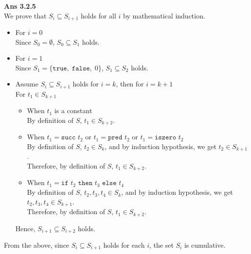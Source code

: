 \documentclass[a4paper,11pt,fleqn,dvipdfmx]{article}
\newcommand{\ansen}[1]{\noindent\textbf{Ans #1}\\[2mm]}
\begin{document}
    \pagebreak

    \ansen{3.2.5}
        We prove that $S_i \subseteq S_{i+1}$ holds for all $i$ by mathematical induction.
        \begin{itemize}
            \item For $i=0$ \\[2mm]
                Since $S_0 = \emptyset$, $S_0 \subseteq S_1$ holds.
            \item For $i=1$ \\[2mm]
                Since $S_1 = \{\texttt{true}, \; \texttt{false}, \; 0\}$, $S_1 \subseteq S_2$ holds.
            \item Assume $S_i \subseteq S_{i+1}$ holds for $i=k$, then for $i=k+1$ \\[2mm]
                For $t_1 \in S_{k+1}$
                \begin{itemize}
                    \item When $t_1$ is a constant \\[2mm]
                        By definition of $S$, $t_1 \in S_{k+2}$.
                    \item When $t_1 = \texttt{succ } t_2$ or $t_1 = \texttt{pred } t_2$ or $t_1 = \texttt{iszero } t_2$ \\[2mm]
                        By definition of $S$, $t_2 \in S_k$, and by induction hypothesis, we get $t_2 \in S_{k+1}$. \\
                        Therefore, by definition of $S$, $t_1 \in S_{k+2}$.
                    \item When $t_1 = \texttt{if } t_2 \texttt{ then } t_3 \texttt{ else } t_4$ \\[2mm]
                        By definition of $S$, $t_2, t_3, t_4 \in S_k$, and by induction hypothesis, we get $t_2, t_3, t_4 \in S_{k+1}$. \\
                        Therefore, by definition of $S$, $t_1 \in S_{k+2}$.
                \end{itemize}
                Hence, $S_{i+1} \subseteq S_{i+2}$ holds.
        \end{itemize}
        From the above, since $S_i \subseteq S_{i+1}$ holds for each $i$, the set $S_i$ is cumulative.

    \vspace{10mm}
\end{document}
